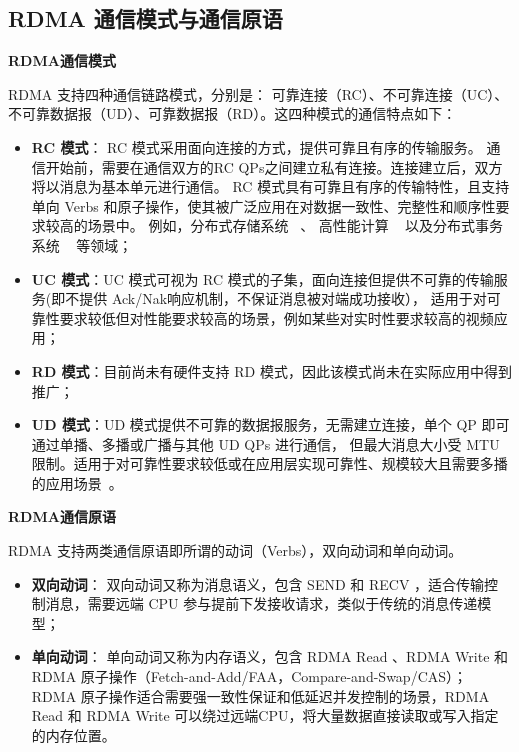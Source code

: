 {    \subsection{RDMA 通信模式与通信原语}

    \textbf{RDMA通信模式}

    RDMA 支持四种通信链路模式，分别是：
    可靠连接（RC）、不可靠连接（UC）、不可靠数据报（UD）、可靠数据报（RD）。这四种模式的通信特点如下：

    \begin{itemize}
        \item \textbf{RC 模式}： RC 模式采用面向连接的方式，提供可靠且有序的传输服务。
              通信开始前，需要在通信双方的RC QPs之间建立私有连接。连接建立后，双方将以消息为基本单元进行通信。
              RC 模式具有可靠且有序的传输特性，且支持单向 Verbs 和原子操作，使其被广泛应用在对数据一致性、完整性和顺序性要求较高的场景中。
              例如，分布式存储系统 ~\citep{christopher2013pilaf, drago2014farm, xingda2020xstore}、
              高性能计算 ~\citep{graham2005OpenMPI, Huang2006MVAPICH2} 以及分布式事务系统 ~\citep{xingda2018DrTM+H} 等领域；
        \item \textbf{UC 模式}：UC 模式可视为 RC 模式的子集，面向连接但提供不可靠的传输服务(即不提供 Ack/Nak响应机制，不保证消息被对端成功接收），
              适用于对可靠性要求较低但对性能要求较高的场景，例如某些对实时性要求较高的视频应用；
        \item \textbf{RD 模式}：目前尚未有硬件支持 RD 模式，因此该模式尚未在实际应用中得到推广；
        \item \textbf{UD 模式}：UD 模式提供不可靠的数据报服务，无需建立连接，单个 QP 即可通过单播、多播或广播与其他 UD QPs 进行通信，
              但最大消息大小受 MTU 限制。适用于对可靠性要求较低或在应用层实现可靠性、规模较大且需要多播的应用场景~\citep{kalia2014herd,kalia2016fasst}。
    \end{itemize}

    \textbf{RDMA通信原语}

    RDMA 支持两类通信原语即所谓的动词（Verbs），双向动词和单向动词。

    \begin{itemize}
        \item \textbf{双向动词}： 双向动词又称为消息语义，包含 SEND 和 RECV ，适合传输控制消息，需要远端 CPU 参与提前下发接收请求，类似于传统的消息传递模型；
        \item \textbf{单向动词}： 单向动词又称为内存语义，包含 RDMA Read 、RDMA Write 和 RDMA 原子操作（Fetch-and-Add/FAA，Compare-and-Swap/CAS）；
              RDMA 原子操作适合需要强一致性保证和低延迟并发控制的场景，RDMA Read 和 RDMA Write 可以绕过远端CPU，将大量数据直接读取或写入指定的内存位置。
    \end{itemize}

}
